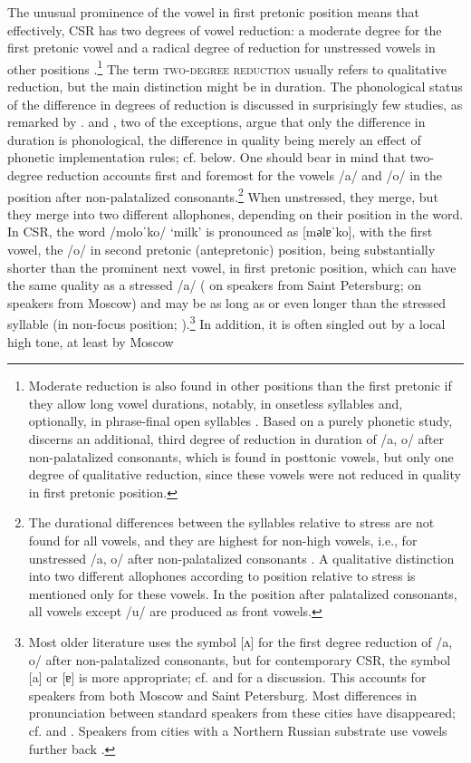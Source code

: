 \documentclass[output=paper,colorlinks,citecolor=black]{langscibook}
\begin{document}
\largerpage
The unusual prominence of the vowel in first pretonic position means that effectively, CSR has two degrees of vowel reduction: a moderate degree for the first pretonic vowel and a radical degree of reduction for unstressed vowels in other positions \citep[e.g.][]{Crosswhite2000}.\footnote{Moderate reduction is also found in other positions than the first pretonic if they allow long vowel durations, notably, in onsetless syllables and, optionally, in phrase-final open syllables \citep[e.g.][]{Barnes2006,Iosad2012}. Based on a purely phonetic study, \citet{Kuznecov1997} discerns an additional, third degree of reduction in duration of /a, o/ after non-palatalized consonants, which is found in posttonic vowels, but only one degree of qualitative reduction, since these vowels were not reduced in quality in first pretonic position.} The term \textsc{two-degree reduction} usually refers to qualitative reduction, but the main distinction might be in duration. The phonological status of the difference in degrees of reduction is discussed in surprisingly few studies, as remarked by \citet[133]{Molczanow2015}. \citet{Barnes2006} and \citet{Iosad2012}, two of the exceptions, argue that only the difference in duration is phonological, the difference in quality being merely an effect of phonetic implementation rules; cf.  below. One should bear in mind that two-degree reduction accounts first and foremost for the vowels /a/ and /o/ in the position after non-palatalized consonants.\footnote{\label{post:fn:DurationalDifferences}The durational differences between the syllables relative to stress are not found for all vowels, and they are highest for non-high vowels, i.e., for unstressed /a, o/ after non-palatalized consonants \citep{BondarkoEtAl1966,Zlatoustova1981,PadgettTabain2005}. A qualitative distinction into two different allophones according to position relative to stress is mentioned only for these vowels. In the position after palatalized consonants, all vowels except /u/ are produced as front vowels.} When unstressed, they merge, but they merge into two different allophones, depending on their position in the word. In CSR, the word /moloˈko/ `milk' is pronounced as [mәlɐˈko], with the first vowel, the /o/ in second pretonic (antepretonic) position, being substantially shorter than the prominent next vowel, in first pretonic position, which can have the same quality as a stressed /a/ (\citealt{Kuznecov1997} on speakers from Saint Petersburg; \citealt{Knjazev2006} on speakers from Moscow) and may be as long as or even longer than the stressed syllable (in non-focus position; \citealt{Knjazev2006}).\footnote{Most older literature uses the symbol [ʌ] for the first degree reduction of /a, o/ after non-palatalized consonants, but for contemporary CSR, the symbol [a] or [ɐ] is more appropriate; cf. \citet{Kasatkina2005} and \citet{Iosad2012} for a discussion. This accounts for speakers from both Moscow and Saint Petersburg. Most differences in pronunciation between standard speakers from these cities have disappeared; cf. \citet{Verbickaja1977} and \citet{Kuznecov1997}. Speakers from cities with a Northern Russian substrate use vowels further back \citep{Kasatkina2005}.} In addition, it is often singled out by a local high tone, at least by Moscow 
\end{document}
